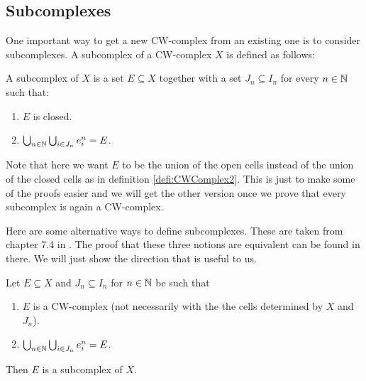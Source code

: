 \subsection{Subcomplexes}

One important way to get a new CW-complex from an existing one is to consider subcomplexes. 
A subcomplex of a CW-complex $X$ is defined as follows:

\begin{defi}
    A subcomplex of $X$ is a set $E \subseteq X$ together with a set $J_n \subseteq I_n$ for every $n \in \bN$ such that:
    \begin{enumerate}
        \item $E$ is closed.
        \item $\bigcup_{n \in \bN} \bigcup_{i \in J_n} \openCell{n}{i} = E$.
    \end{enumerate}
\end{defi}

Note that here we want $E$ to be the union of the open cells instead of the union of the closed cells as in definition \ref{defi:CWComplex2}. 
This is just to make some of the proofs easier and we will get the other version once we prove that every subcomplex is again a CW-complex. 

Here are some alternative ways to define subcomplexes. 
These are taken from chapter 7.4 in \cite{Klaus2001}.
The proof that these three notions are equivalent can be found in there. 
We will just show the direction that is useful to us. 

\begin{lem}
    Let $E \subseteq X$ and $J_n \subseteq I_n$ for $n \in \bN$ be such that 
    \begin{enumerate}
        \item $E$ is a CW-complex (not necessarily with the the cells determined by $X$ and $J_n$).
        \item $\bigcup_{n \in \bN} \bigcup_{i \in J_n} \openCell{n}{i} = E$.
    \end{enumerate}
    Then $E$ is a subcomplex of $X$.
\end{lem}